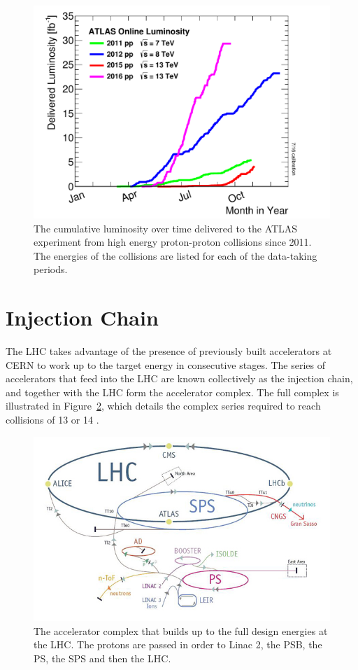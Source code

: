 \begin{figure}
\centering
\includegraphics[width=\fullfig]{figures/lumi_years.pdf}
\caption{The cumulative luminosity over time delivered to the ATLAS experiment from high energy proton-proton collisions since 2011. The energies of the collisions are listed for each of the data-taking periods.}
\label{fig:lumi_years}
\end{figure}

\section{Injection Chain}
The \ac{LHC} takes advantage of the presence of previously built accelerators at \ac{CERN} to work up to the target energy in consecutive stages.
The series of accelerators that feed into the \ac{LHC} are known collectively as the injection chain, and together with the \ac{LHC} form the accelerator complex.
The full complex is illustrated in Figure~\ref{fig:accelerator_complex}, which details the complex series required to reach collisions of 13 or 14 \TeV. 

\begin{figure}[h]
\centering
\includegraphics[width=\fullfig]{figures/accelerator_complex.jpg}
\caption{The accelerator complex that builds up to the full design energies at the \ac{LHC}. The protons are passed in order to Linac 2, the \acs{PSB}, the \acs{PS}, the \acs{SPS} and then the \ac{LHC}.}
\label{fig:accelerator_complex}
\end{figure}

